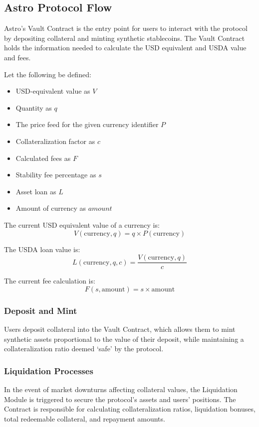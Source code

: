 \subsection{Astro Protocol Flow}
Astro's Vault Contract is the entry point for users to interact with the protocol by depositing collateral and minting synthetic stablecoins. The Vault Contract holds the information needed to calculate the USD equivalent and USDA value and fees.

Let the following be defined:
\begin{itemize}
    \item USD-equivalent value as \( V \)
    \item Quantity as \( q \)
    \item The price feed for the given currency identifier \( P \)
    \item Collateralization factor as \( c \)
    \item Calculated fees as \( F \)
    \item Stability fee percentage as \( s \)
    \item Asset loan as \( L \)
    \item Amount of currency as \( amount \)
\end{itemize}
\vspace{1em}
The current USD equivalent value of a currency is:
\[
V(\text{currency}, q) = q \times P(\text{currency})
\]

The USDA loan value is:
\[
L(\text{currency}, q, c) = \frac{V(\text{currency}, q)}{c}
\]

The current fee calculation is:
\[
F(s, \text{amount}) = s \times \text{amount}
\]

\subsubsection{Deposit and Mint}
Users deposit collateral into the Vault Contract, which allows them to mint synthetic assets proportional to the value of their deposit, while maintaining a collateralization ratio deemed ‘safe’ by the protocol.

\subsubsection{Liquidation Processes}
In the event of market downturns affecting collateral values, the Liquidation Module is triggered to secure the protocol's assets and users' positions. The Contract is responsible for calculating collateralization ratios, liquidation bonuses, total redeemable collateral, and repayment amounts.\\

